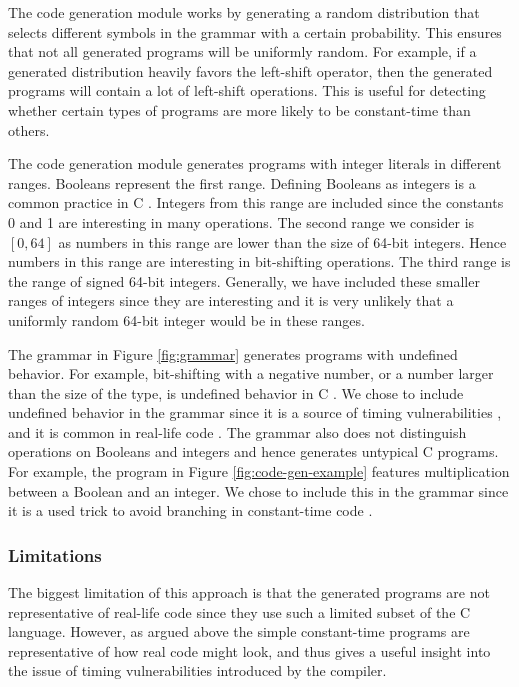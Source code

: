 The code generation module works by generating a random distribution that selects different symbols in the grammar with a certain probability.
This ensures that not all generated programs will be uniformly random.
For example, if a generated distribution heavily favors the left-shift operator, then the generated programs will contain a lot of left-shift operations.
This is useful for detecting whether certain types of programs are more likely to be constant-time than others.

The code generation module generates programs with integer literals in different ranges. 
Booleans represent the first range.
Defining Booleans as integers is a common practice in C \citep{c-standard}.
Integers from this range are included since the constants 0 and 1 are interesting in many operations.
The second range we consider is $[0, 64]$ as numbers in this range are lower than the size of 64-bit integers.
Hence numbers in this range are interesting in bit-shifting operations.
The third range is the range of signed 64-bit integers.
Generally, we have included these smaller ranges of integers since they are interesting and it is very unlikely that a uniformly random 64-bit integer would be in these ranges.

The grammar in Figure \ref{fig:grammar} generates programs with undefined behavior.
For example, bit-shifting with a negative number, or a number larger than the size of the type, is undefined behavior in C \citep{c-standard}.
We chose to include undefined behavior in the grammar since it is a source of timing vulnerabilities \citep{what-you-c}, and it is common in real-life code \citep{undefined-behavior-c}.
The grammar also does not distinguish operations on Booleans and integers and hence generates untypical C programs.
For example, the program in Figure \ref{fig:code-gen-example} features multiplication between a Boolean and an integer.
We chose to include this in the grammar since it is a used trick to avoid branching in constant-time code \citep{what-you-c}.

\subsubsection{Limitations}
The biggest limitation of this approach is that the generated programs are not representative of real-life code since they use such a limited subset of the C language.
However, as argued above the simple constant-time programs are representative of how real code might look, and thus gives a useful insight into the issue of timing vulnerabilities introduced by the compiler.